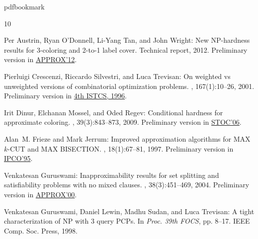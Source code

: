 %
%
%
%
%
\providecommand{\bibhead}[1]{}
%
\expandafter\ifx\csname pdfbookmark\endcsname\relax%
  \providecommand{\tocrefpdfbookmark}{}
\else\providecommand{\tocrefpdfbookmark}{%
   \hypertarget{tocreferences}{}%
   \pdfbookmark[1]{References}{tocreferences}}%
\fi

\tocrefpdfbookmark
\begin{thebibliography}{10}

\bibhead{aow12}
{\sc Per Austrin, Ryan O'Donnell, Li-Yang Tan, and John Wright}: New
  {NP}-hardness results for 3-coloring and 2-to-1 label cover.
\newblock Technical report, 2012.
\newblock Preliminary version in
  \href{http://dx.doi.org/10.1007/978-3-642-32512-0_1}{APPROX'12}.

\bibhead{CST01}
{\sc Pierluigi Crescenzi, Riccardo Silvestri, and Luca Trevisan}: On weighted
  vs unweighted versions of combinatorial optimization problems.
, 167(1):10--26, 2001.
\newblock Preliminary version in
  \href{http://www.informatik.uni-trier.de/~ley/db/conf/istcs/istcs1996.html}{4th
  ISTCS, 1996}.

\bibhead{DMR}
{\sc Irit Dinur, Elchanan Mossel, and Oded Regev}: Conditional hardness for
  approximate coloring.
, 39(3):843--873, 2009.
\newblock Preliminary version in
  \href{http://dx.doi.org/10.1145/1132516.1132567}{STOC'06}.
\newblock [\epfmtdoi{10.1137/07068062X}]

\bibhead{FJ97}
{\sc Alan~M. Frieze and Mark Jerrum}: Improved approximation algorithms for
  {MAX} ${k}$-{CUT} and {MAX BISECTION}.
, 18(1):67--81, 1997.
\newblock Preliminary version in
  \href{http://dx.doi.org/10.1007/3-540-59408-6_37}{IPCO'95}.
\newblock [\epfmtdoi{10.1007/BF02523688}]

\bibhead{Gur-set-splitting}
{\sc Venkatesan Guruswami}: Inapproximability results for set splitting and
  satisfiability problems with no mixed clauses.
, 38(3):451--469, 2004.
\newblock Preliminary version in
  \href{http://dx.doi.org/10.1007/3-540-44436-X_16}{APPROX'00}.
\newblock [\epfmtdoi{10.1007/s00453-003-1072-z}]

\bibhead{GLST}
{\sc Venkatesan Guruswami, Daniel Lewin, Madhu Sudan, and Luca Trevisan}: A
  tight characterization of {NP} with 3 query {PCP}s.
\newblock In {\em Proc. 39th FOCS}, pp. 8--17. IEEE Comp. Soc. Press, 1998.


\end{thebibliography}
